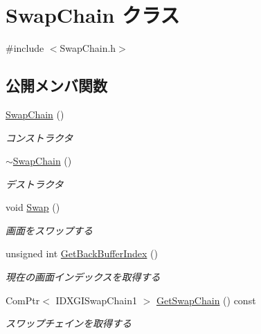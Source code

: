 \hypertarget{class_swap_chain}{}\section{Swap\+Chain クラス}
\label{class_swap_chain}


{\ttfamily \#include $<$Swap\+Chain.\+h$>$}

\subsection*{公開メンバ関数}
\begin{DoxyCompactItemize}
\item 
\mbox{\hyperlink{class_swap_chain_ab1e68cac26bb0b4e97b68b9e4a3086a4}{Swap\+Chain}} ()
\begin{DoxyCompactList}\small\item\em コンストラクタ \end{DoxyCompactList}\item 
\mbox{\hyperlink{class_swap_chain_a58c288346a3fa211fbcc2cec594bfa68}{$\sim$\+Swap\+Chain}} ()
\begin{DoxyCompactList}\small\item\em デストラクタ \end{DoxyCompactList}\item 
void \mbox{\hyperlink{class_swap_chain_abd79852ff31daa97e5fd78ae7701bcf8}{Swap}} ()
\begin{DoxyCompactList}\small\item\em 画面をスワップする \end{DoxyCompactList}\item 
unsigned int \mbox{\hyperlink{class_swap_chain_a30a3e70cede922d5310b82b758ddd10f}{Get\+Back\+Buffer\+Index}} ()
\begin{DoxyCompactList}\small\item\em 現在の画面インデックスを取得する \end{DoxyCompactList}\item 
Com\+Ptr$<$ I\+D\+X\+G\+I\+Swap\+Chain1 $>$ \mbox{\hyperlink{class_swap_chain_a4653a1350dd35b0b9d55ee098b02f82a}{Get\+Swap\+Chain}} () const
\begin{DoxyCompactList}\small\item\em スワップチェインを取得する \end{DoxyCompactList}\end{DoxyCompactItemize}
